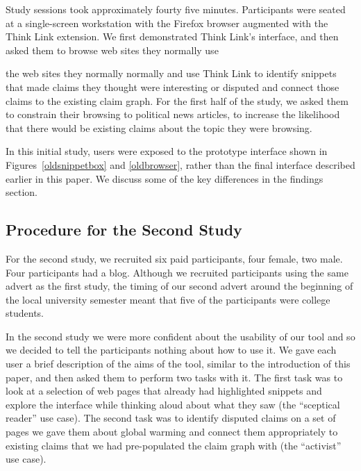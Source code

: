 \documentclass{chi2009}
\newcommand{\todo}[1]{}
\begin{document}
\todo{Get the correct number of bloggers}

\todo{This was a bad recruiting strategy. We should have recruited people that fitted one of our two personas and then set them tasks that fitted our vision for that persona.}

Study sessions took approximately fourty five minutes. Participants were seated at a single-screen workstation with the Firefox browser augmented with the Think Link extension. We first demonstrated Think Link's interface, and then asked them to browse web sites they normally use

the web sites they normally normally and use Think Link to identify snippets that made claims they thought were interesting or disputed and connect those claims to the existing claim graph. For the first half of the study, we asked them to constrain their browsing to political news articles, to increase the likelihood that there would be existing claims about the topic they were browsing.

In this initial study, users were exposed to the prototype interface shown in Figures~\ref{oldsnippetbox} and \ref{oldbrowser}, rather than the final interface described earlier in this paper. We discuss some of the key differences in the findings section.

\subsection{Procedure for the Second Study}

For the second study, we recruited six paid participants, four female, two male. Four participants had a blog. Although we recruited participants using the same advert as the first study, the timing of our second advert around the beginning of the local university semester meant that five of the participants were college students. 

In the second study we were more confident about the usability of our tool and so we decided to tell the participants nothing about how to use it. We gave each user a brief description of the aims of the tool, similar to the introduction of this paper, and then asked them to perform two tasks with it. The first task was to look at a selection of web pages that already had highlighted snippets and explore the interface while thinking aloud about what they saw (the ``sceptical reader'' use case). The second task was to identify disputed claims on a set of pages we gave them about global warming and connect them appropriately to existing claims that we had pre-populated the claim graph with (the ``activist'' use case). 
\end{document}
